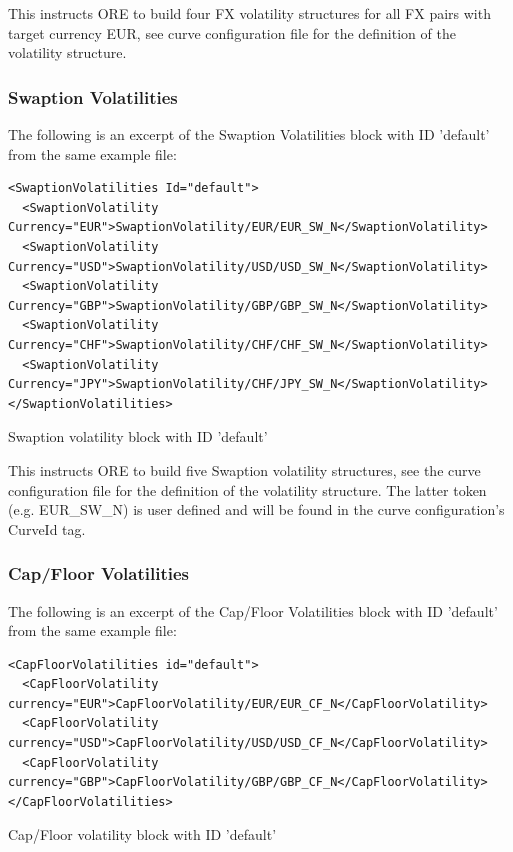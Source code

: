 \documentclass[12pt, a4paper]{article}
\begin{document}
This instructs ORE to build four FX volatility structures for all FX pairs with target currency EUR, see curve
configuration file for the definition of the volatility structure.

\subsubsection{Swaption Volatilities}

The following is an excerpt of the Swaption Volatilities block with ID 'default' from the same example file:

\begin{listing}[H]
\begin{verbatim}
<SwaptionVolatilities Id="default">
  <SwaptionVolatility Currency="EUR">SwaptionVolatility/EUR/EUR_SW_N</SwaptionVolatility>
  <SwaptionVolatility Currency="USD">SwaptionVolatility/USD/USD_SW_N</SwaptionVolatility>
  <SwaptionVolatility Currency="GBP">SwaptionVolatility/GBP/GBP_SW_N</SwaptionVolatility>
  <SwaptionVolatility Currency="CHF">SwaptionVolatility/CHF/CHF_SW_N</SwaptionVolatility>
  <SwaptionVolatility Currency="JPY">SwaptionVolatility/CHF/JPY_SW_N</SwaptionVolatility>
</SwaptionVolatilities>
\end{verbatim}
\caption{Swaption volatility block with ID 'default'}
\label{lst:swaptionvol_spec}
\end{listing}

This instructs ORE to build five Swaption volatility structures, see the curve configuration file for the definition of
the volatility structure. The latter token (e.g. EUR\_SW\_N) is user defined and will be found in the curve
configuration's CurveId tag.

\subsubsection{Cap/Floor Volatilities}

The following is an excerpt of the Cap/Floor Volatilities block with ID 'default' from the same example file:

\begin{listing}[H]
\begin{verbatim}
<CapFloorVolatilities id="default">
  <CapFloorVolatility currency="EUR">CapFloorVolatility/EUR/EUR_CF_N</CapFloorVolatility>
  <CapFloorVolatility currency="USD">CapFloorVolatility/USD/USD_CF_N</CapFloorVolatility>
  <CapFloorVolatility currency="GBP">CapFloorVolatility/GBP/GBP_CF_N</CapFloorVolatility>
</CapFloorVolatilities>
\end{verbatim}
\caption{Cap/Floor volatility block with ID 'default'}
\label{lst:capfloorvol_spec}
\end{listing}
\end{document}
